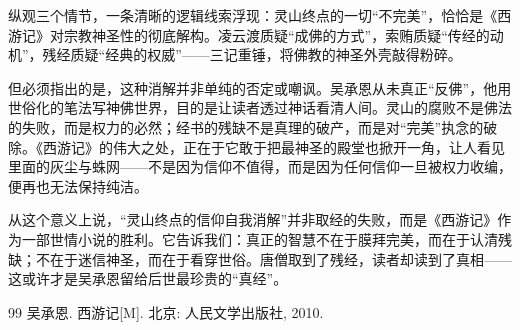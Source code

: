 \documentclass{ctexart}
\begin{document}
纵观三个情节，一条清晰的逻辑线索浮现：灵山终点的一切“不完美”，恰恰是《西游记》对宗教神圣性的彻底解构。凌云渡质疑“成佛的方式”，索贿质疑“传经的动机”，残经质疑“经典的权威”——三记重锤，将佛教的神圣外壳敲得粉碎。

但必须指出的是，这种消解并非单纯的否定或嘲讽。吴承恩从未真正“反佛”，他用世俗化的笔法写神佛世界，目的是让读者透过神话看清人间。灵山的腐败不是佛法的失败，而是权力的必然；经书的残缺不是真理的破产，而是对“完美”执念的破除。《西游记》的伟大之处，正在于它敢于把最神圣的殿堂也掀开一角，让人看见里面的灰尘与蛛网——不是因为信仰不值得，而是因为任何信仰一旦被权力收编，便再也无法保持纯洁。

从这个意义上说，“灵山终点的信仰自我消解”并非取经的失败，而是《西游记》作为一部世情小说的胜利。它告诉我们：真正的智慧不在于膜拜完美，而在于认清残缺；不在于迷信神圣，而在于看穿世俗。唐僧取到了残经，读者却读到了真相——这或许才是吴承恩留给后世最珍贵的“真经”。

\begin{thebibliography}{99}
 吴承恩. 西游记[M]. 北京: 人民文学出版社, 2010.
\end{thebibliography}
\end{document}
